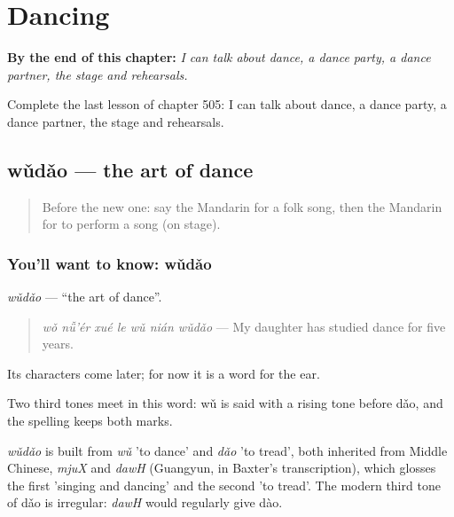 
\chapter{Dancing}
\label{ch:zh-dancing}

\begin{chapteropening}
\textbf{By the end of this chapter:} \emph{I can talk about dance, a dance party, a dance partner, the stage and rehearsals.}

Complete the last lesson of chapter 505: I can talk about dance, a dance party, a dance partner, the stage and rehearsals.
\end{chapteropening}

\section[wǔdǎo]{wǔdǎo — the art of dance}

\label{lesson:ZH-C505-wudao}



\begin{quote}
Before the new one: say the Mandarin for a folk song, then the Mandarin for to perform a song (on stage).
\end{quote}

\subsection*{You'll want to know: wǔdǎo}
\emph{wǔdǎo} — \textquotedblleft{}the art of dance\textquotedblright{}.

\begin{quote}
\emph{wǒ nǚ'ér xué le wǔ nián wǔdǎo} — My daughter has studied dance for five years.
\end{quote}

Its characters come later; for now it is a word for the ear.

Two third tones meet in this word: wǔ is said with a rising tone before dǎo, and the spelling keeps both marks.

\begin{cousinweb}
\emph{wǔdǎo} is built from \emph{wǔ} 'to dance' and \emph{dǎo} 'to tread', both inherited from Middle Chinese, \emph{mjuX} and \emph{dawH} (Guangyun, in Baxter's transcription), which glosses the first 'singing and dancing' and the second 'to tread'. The modern third tone of dǎo is irregular: \emph{dawH} would regularly give dào.
\end{cousinweb}

